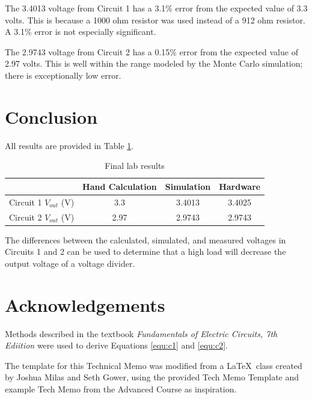 \documentclass[EEEE]{KGCOEReport}
\begin{document}
The 3.4013 voltage from Circuit 1 has a 3.1\% error from the expected value of
3.3 volts. This is because a 1000 ohm resistor was used instead of a 912 ohm
resistor. A 3.1\% error is not especially significant.

The 2.9743 voltage from Circuit 2 has a 0.15\% error from the expected value of
2.97 volts. This is well within the range modeled by the Monte Carlo
simulation; there is exceptionally low error.

\section{Conclusion}

All results are provided in Table \ref{tbl:conc}.

\begin{table}[H]
	\center
	\begin{tabular}{|c|c|c|c|}
		\hline
		                        & Hand Calculation & Simulation & Hardware \\
		\hline
		Circuit 1 $V_{out}$ (V) & 3.3              & 3.4013     & 3.4025   \\
		\hline
		Circuit 2 $V_{out}$ (V) & 2.97             & 2.9743     & 2.9743   \\
		\hline
	\end{tabular}
	\caption{Final lab results}
	\label{tbl:conc}
\end{table}

The differences between the calculated, simulated, and measured voltages in
Circuits 1 and 2 can be used to determine that a high load will decrease the
output voltage of a voltage divider.

\section{Acknowledgements}

Methods described in the textbook \textit{Fundamentals of Electric Circuits,
	7th Ediition} \cite{fec} were used to derive Equations \ref{equ:c1} and
\ref{equ:c2}.

The template for this Technical Memo was modified from a \LaTeX \ class created
by Joshua Milas and Seth Gower, using the provided Tech Memo Template and
example Tech Memo from the Advanced Course as inspiration.

\printbibliography
\end{document}
